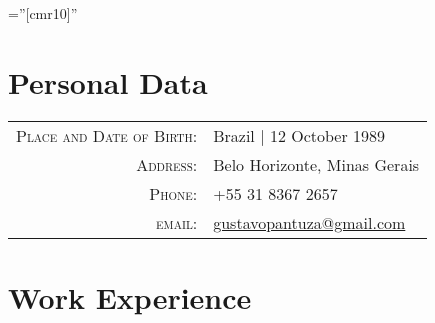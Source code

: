 \documentclass[a4paper,10pt]{article} %
\begin{document}
\pagestyle{empty} %

\font\fb=''[cmr10]'' %





\par{\bigskip\par} %

\section{Personal Data}

\begin{tabular}{rl}
\textsc{Place and Date of Birth:} & Brazil | 12 October 1989 \\
\textsc{Address:} & Belo Horizonte, Minas Gerais \\
\textsc{Phone:} & +55 31 8367 2657\\
\textsc{email:} & \href{mailto:gustavopantuza@gmail.com}{gustavopantuza@gmail.com}
\end{tabular}





\section{Work Experience}
\end{document}

